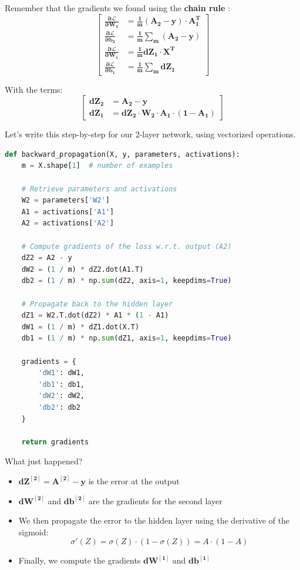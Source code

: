 \documentclass[11pt]{article}
\begin{document}
Remember that the gradients we found using the \textbf{chain rule} :
\[
\left[
\begin{aligned}
\mathbf{\frac{\partial \mathcal{L}}{\partial W_2}} &= \mathbf{\frac{1}{m} (A_2 - y) \cdot A_1^T} \\
\mathbf{\frac{\partial \mathcal{L}}{\partial b_2}} &= \mathbf{\frac{1}{m} \sum_m{(A_2 - y)}} \\
\mathbf{\frac{\partial \mathcal{L}}{\partial W_1}} &= \mathbf{\frac{1}{m} dZ_1 \cdot X^T} \\
\mathbf{\frac{\partial \mathcal{L}}{\partial b_1}} &= \mathbf{\frac{1}{m} \sum_m{dZ_1}}
\end{aligned}
\right]
\]

With the terms:
\[
\left[
\begin{aligned}
\mathbf{dZ_2} &= \mathbf{A_2 - y} \\
\mathbf{dZ_1} &= \mathbf{dZ_2 \cdot W_2 \cdot A_1 \cdot (1 - A_1)}
\end{aligned}
\right]
\]

Let’s write this step-by-step for our 2-layer network, using vectorized operations.

\begin{lstlisting}[language=Python]
def backward_propagation(X, y, parameters, activations):
    m = X.shape[1]  # number of examples

    # Retrieve parameters and activations
    W2 = parameters['W2']
    A1 = activations['A1']
    A2 = activations['A2']

    # Compute gradients of the loss w.r.t. output (A2)
    dZ2 = A2 - y
    dW2 = (1 / m) * dZ2.dot(A1.T)
    db2 = (1 / m) * np.sum(dZ2, axis=1, keepdims=True)

    # Propagate back to the hidden layer
    dZ1 = W2.T.dot(dZ2) * A1 * (1 - A1)
    dW1 = (1 / m) * dZ1.dot(X.T)
    db1 = (1 / m) * np.sum(dZ1, axis=1, keepdims=True)

    gradients = {
        'dW1': dW1,
        'db1': db1,
        'dW2': dW2,
        'db2': db2
    }

    return gradients
\end{lstlisting}

\medskip

\noindent What just happened?

\begin{itemize}
    \item $\boldsymbol{dZ^{[2]} = A^{[2]} - y}$ is the error at the output
    \item $\boldsymbol{dW^{[2]}}$ and $\boldsymbol{db^{[2]}}$ are the gradients for the second layer
    \item We then propagate the error to the hidden layer using the derivative of the sigmoid:
    \[
    \sigma'(Z) = \sigma(Z) \cdot (1 - \sigma(Z)) = A \cdot (1 - A)
    \]
    \item Finally, we compute the gradients $\boldsymbol{dW^{[1]}}$ and $\boldsymbol{db^{[1]}}$
\end{itemize}
\end{document}
